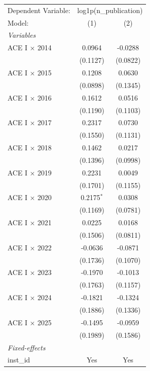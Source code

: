 
\begingroup
\centering
\begin{tabular}{lcc}
   \tabularnewline \midrule \midrule
   Dependent Variable: & \multicolumn{2}{c}{log1p(n\_publication)}\\
   Model:         & (1)          & (2)\\  
   \midrule
   \emph{Variables}\\
   ACE I × 2014   & 0.0964       & -0.0288\\   
                  & (0.1127)     & (0.0822)\\   
   ACE I × 2015   & 0.1208       & 0.0630\\   
                  & (0.0898)     & (0.1345)\\   
   ACE I × 2016   & 0.1612       & 0.0516\\   
                  & (0.1190)     & (0.1103)\\   
   ACE I × 2017   & 0.2317       & 0.0730\\   
                  & (0.1550)     & (0.1131)\\   
   ACE I × 2018   & 0.1462       & 0.0217\\   
                  & (0.1396)     & (0.0998)\\   
   ACE I × 2019   & 0.2231       & 0.0049\\   
                  & (0.1701)     & (0.1155)\\   
   ACE I × 2020   & 0.2175$^{*}$ & 0.0308\\   
                  & (0.1169)     & (0.0781)\\   
   ACE I × 2021   & 0.0225       & 0.0168\\   
                  & (0.1506)     & (0.0811)\\   
   ACE I × 2022   & -0.0636      & -0.0871\\   
                  & (0.1736)     & (0.1070)\\   
   ACE I × 2023   & -0.1970      & -0.1013\\   
                  & (0.1763)     & (0.1157)\\   
   ACE I × 2024   & -0.1821      & -0.1324\\   
                  & (0.1886)     & (0.1336)\\   
   ACE I × 2025   & -0.1495      & -0.0959\\   
                  & (0.1989)     & (0.1586)\\   
   \midrule
   \emph{Fixed-effects}\\
   inst\_id       & Yes          & Yes\\  

\end{tabular}
